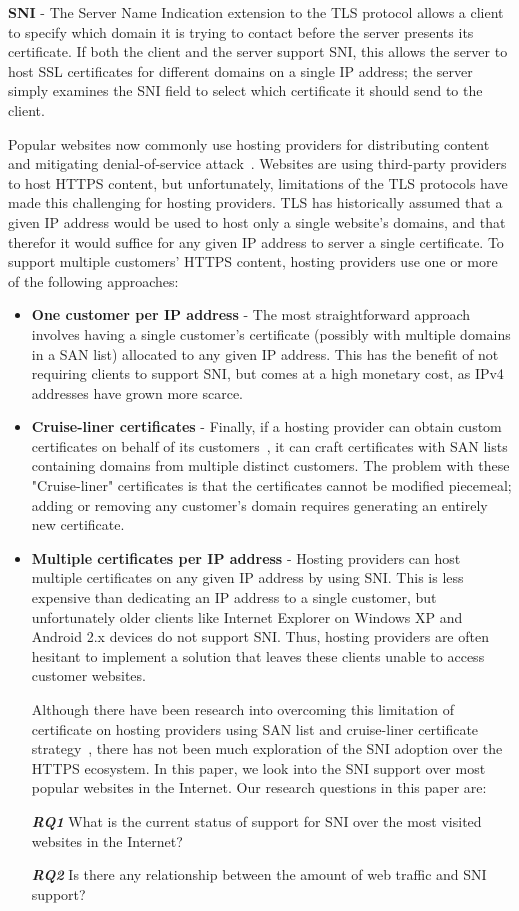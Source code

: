 \documentclass{acm_proc_article-sp}
\begin{document}
\textbf{SNI} - The Server Name Indication extension to the TLS protocol allows a client to specify which domain it is trying to contact before the server presents its certificate. If both the client and the server support SNI, this allows the server to host SSL certificates for different domains on a single IP address; the server simply examines the SNI field to select which certificate it should send to the client.

Popular websites now commonly use hosting providers for distributing content and mitigating denial-of-service attack~\cite{Holz:2011:SLT:2068816.2068856}. Websites are using third-party providers to host HTTPS content, but unfortunately, limitations of the TLS protocols have made this challenging for hosting providers. TLS has historically assumed that a given IP address would be used to host only a single website's domains, and that therefor it would suffice for any given IP address to server a single certificate. To support multiple customers' HTTPS content, hosting providers use one or more of the following approaches:
\begin{itemize}
\item \textbf{One customer per IP address} - The most straightforward approach involves having a single customer’s certificate (possibly with multiple domains in a SAN list) allocated to any given IP address. This has the benefit of not requiring clients to support SNI, but comes at a high monetary cost, as IPv4 addresses have grown more scarce.
\item \textbf{Cruise-liner certificates} - Finally, if a hosting provider can obtain custom certificates on behalf of its customers~\cite{Liu:2015:EMC:2815675.2815685}, it can craft certificates with SAN lists containing domains from multiple distinct customers. The problem with these "Cruise-liner" certificates is that the certificates cannot be modified piecemeal; adding or removing any customer's domain requires generating an entirely new certificate.
\item \textbf{Multiple certificates per IP address} - Hosting providers can host multiple certificates on any given IP address by using SNI. This is less expensive than dedicating an IP address to a single customer, but unfortunately older clients like Internet Explorer on Windows XP and Android 2.x devices do not support SNI. Thus, hosting providers are often hesitant to implement a solution that leaves these clients unable to access customer websites.

Although there have been research into overcoming this limitation of certificate on hosting providers using SAN list and cruise-liner certificate strategy~\cite{Cangialosi:2016:MAP:2976749.2978301}, there has not been much exploration of the SNI adoption over the HTTPS ecosystem. In this paper, we look into the SNI support over most popular websites in the Internet. Our research questions in this paper are:

\textbf{\textit{RQ1}} What is the current status of support for SNI over the most visited websites in the Internet?

\textbf{\textit{RQ2}} Is there any relationship between the amount of web traffic and SNI support?
\end{itemize}
\end{document}
